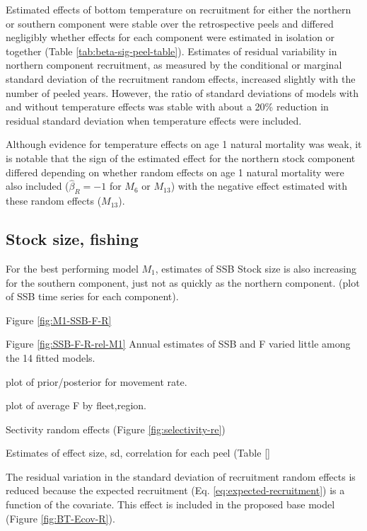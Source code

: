 \documentclass[
]{article}
\begin{document}
Estimated effects of bottom temperature on recruitment for either the
northern or southern component were stable over the retrospective peels
and differed negligibly whether effects for each component were
estimated in isolation or together (Table
\ref{tab:beta-sig-peel-table}). Estimates of residual variability in
northern component recruitment, as measured by the conditional or
marginal standard deviation of the recruitment random effects, increased
slightly with the number of peeled years. However, the ratio of standard
deviations of models with and without temperature effects was stable
with about a 20\% reduction in residual standard deviation when
temperature effects were included.

Although evidence for temperature effects on age 1 natural mortality was
weak, it is notable that the sign of the estimated effect for the
northern stock component differed depending on whether random effects on
age 1 natural mortality were also included (\(\widehat \beta_R = -1\)
for \(M_{6}\) or \(M_{13}\)) with the negative effect estimated with
these random effects (\(M_{13}\)).

\hypertarget{stock-size-fishing}{%
\subsection*{Stock size, fishing}\label{stock-size-fishing}}

For the best performing model \(M_1\), estimates of SSB Stock size is
also increasing for the southern component, just not as quickly as the
northern component. (plot of SSB time series for each component).

Figure \ref{fig:M1-SSB-F-R}

Figure \ref{fig:SSB-F-R-rel-M1} Annual estimates of SSB and F varied
little among the 14 fitted models.

plot of prior/posterior for movement rate.

plot of average F by fleet,region.

Sectivity random effects (Figure \ref{fig:selectivity-re})

Estimates of effect size, sd, correlation for each peel (Table \ref{}

The residual variation in the standard deviation of recruitment random
effects is reduced because the expected recruitment (Eq.
\ref{eq:expected-recruitment}) is a function of the covariate. This
effect is included in the proposed base model (Figure
\ref{fig:BT-Ecov-R}).
\end{document}
